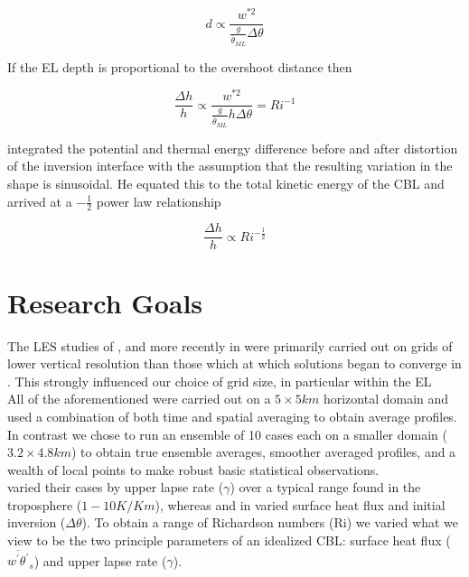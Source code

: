 \begin{equation}
d \propto \frac{w^{*2}}{\frac{g}{\overline{\theta}_{ML}} \Delta \theta} 
\end{equation} 

If the \acs{EL} depth is proportional to the overshoot distance then

\begin{equation}
\frac{\Delta h}{h} \propto \frac{w^{*2}}{\frac{g}{\overline{\theta}_{ML}} h \Delta \theta} = Ri^{-1} 
\end{equation} 

\citeauthor{Boers89} \cite{Boers89} integrated the potential and thermal energy difference before and after distortion of 
the inversion interface with the assumption that the resulting variation in the shape is sinusoidal.  He equated this to the total 
kinetic energy of the \acs{CBL} and arrived at a $-\frac{1}{2}$ power law relationship

\begin{equation}
\frac{\Delta h}{h} \propto Ri^{-\frac{1}{2}} 
\end{equation} 


\section{Research Goals}
\label{sec:ResearchGoals}

The LES studies of \citeauthor{SullMoengStev} \cite{SullMoengStev}, \citeauthor{FedConzMir04} \cite{FedConzMir04} and more recently \citeauthor{BrooksFowler2} in \cite{BrooksFowler2} were primarily carried out on grids of lower vertical resolution than those which at which solutions began to converge in \citeauthor{SullPat} \cite{SullPat}. This strongly influenced our choice of grid size, in particular within the \acs{EL}\\

 All of the aforementioned were carried out on a $5 \times 5 km$ horizontal domain and used a combination of both time and spatial averaging to obtain average profiles.  In contrast we chose to run an ensemble of 10 cases each on a smaller domain ($3.2 \times 4.8 km$) to obtain true ensemble averages, smoother averaged profiles, and a wealth of local points to make robust basic statistical observations.\\

\citeauthor{FedConzMir04} \cite{FedConzMir04} varied their cases by upper lapse rate ($\gamma$) over a typical range found in the troposphere ($1 - 10 K / Km$), whereas \citeauthor{SullMoengStev} \cite{SullMoengStev} and \citeauthor{BrooksFowler2} in \cite{BrooksFowler2} varied surface heat flux and initial inversion ($\Delta \theta$).  To obtain a range of Richardson numbers (\acs{Ri}) we varied what we view to be the two principle parameters of an idealized \acs{CBL}: surface heat flux ($\overline{w^{'}\theta^{'}}_{s}$) and upper lapse rate ($\gamma$).\\

